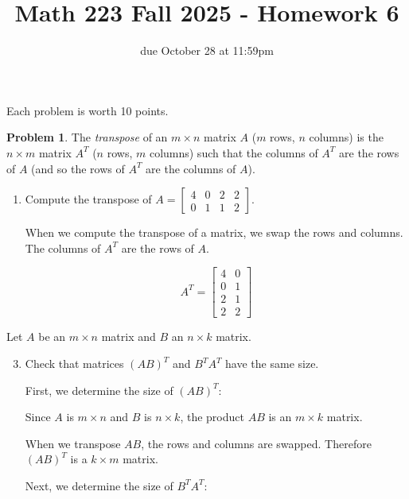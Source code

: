 \documentclass[12pt, oneside]{amsart}
\title{Math 223 Fall 2025 - Homework 6}
\author{due October 28 at 11:59pm}
\theoremstyle{definition}
\newtheorem{prob}{Problem}
\begin{document}
\maketitle
Each problem is worth 10 points.

\begin{prob}
    The \emph{transpose} of an $m\times n$ matrix $A$ ($m$ rows, $n$ columns) is the $n\times m$ matrix $A^T$ ($n$ rows, $m$ columns) such that the columns of $A^T$ are the rows of $A$ (and so the rows of $A^T$ are the columns of $A$).

    \begin{enumerate}
        \item Compute the transpose of $A = \left[\begin{matrix}
        4 & 0 & 2 & 2 \\
        0 & 1 & 1 & 2
        \end{matrix}\right]$.
        
        \begin{solution}
        When we compute the transpose of a matrix, we swap the rows and columns. The columns of $A^T$ are the rows of $A$.
        
        \[
        A^T = \begin{bmatrix}
        4 & 0 \\
        0 & 1 \\
        2 & 1 \\
        2 & 2
        \end{bmatrix}
        \]
        \end{solution}
    \end{enumerate}
    Let $A$ be an $m\times n$ matrix and $B$ an $n\times k$ matrix.
    \begin{enumerate}
    \setcounter{enumi}{2}
    \item Check that matrices $(AB)^T$ and $B^T A^T$ have the same size.
    
    \begin{solution}
    
    First, we determine the size of $(AB)^T$:
    
    Since $A$ is $m \times n$ and $B$ is $n \times k$, the product $AB$ is an $m \times k$ matrix.
    
    When we transpose $AB$, the rows and columns are swapped. Therefore $(AB)^T$ is a $k \times m$ matrix.
    
    \vspace{0.3cm}
    
    Next, we determine the size of $B^T A^T$:
    

\end{solution}
\end{enumerate}
\end{prob}
\end{document}
